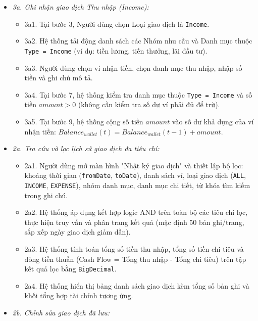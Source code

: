 \documentclass[11pt,a4paper]{article}
\providecommand{\tightlist}{
  \setlength{\itemsep}{0pt}\setlength{\parskip}{0pt}}
\begin{document}
\begin{itemize}
  \begin{itemize}
  \tightlist
  \item
    \emph{3a. Ghi nhận giao dịch Thu nhập (Income):}

    \begin{itemize}
    \tightlist
    \item
      3a1. Tại bước 3, Người dùng chọn Loại giao dịch là
      \texttt{Income}.
    \item
      3a2. Hệ thống tải động danh sách các Nhóm nhu cầu và Danh mục
      thuộc \texttt{Type\ =\ Income} (ví dụ: tiền lương, tiền thưởng,
      lãi đầu tư).
    \item
      3a3. Người dùng chọn ví nhận tiền, chọn danh mục thu nhập, nhập số
      tiền và ghi chú mô tả.
    \item
      3a4. Tại bước 7, hệ thống kiểm tra danh mục thuộc
      \texttt{Type\ =\ Income} và số tiền \(amount > 0\) (không cần kiểm
      tra số dư ví phải đủ để trừ).
    \item
      3a5. Tại bước 9, hệ thống cộng số tiền \(amount\) vào số dư khả
      dụng của ví nhận tiền:
      \(Balance_{wallet}(t) = Balance_{wallet}(t-1) + amount\).
    \end{itemize}
  \item
    \emph{2a. Tra cứu và lọc lịch sử giao dịch đa tiêu chí:}

    \begin{itemize}
    \tightlist
    \item
      2a1. Người dùng mở màn hình "Nhật ký giao dịch" và thiết lập bộ
      lọc: khoảng thời gian (\texttt{fromDate}, \texttt{toDate}), danh
      sách ví, loại giao dịch (\texttt{ALL}, \texttt{INCOME},
      \texttt{EXPENSE}), nhóm danh mục, danh mục chi tiết, từ khóa tìm
      kiếm trong ghi chú.
    \item
      2a2. Hệ thống áp dụng kết hợp logic AND trên toàn bộ các tiêu chí
      lọc, thực hiện truy vấn và phân trang kết quả (mặc định 50 bản
      ghi/trang, sắp xếp ngày giao dịch giảm dần).
    \item
      2a3. Hệ thống tính toán tổng số tiền thu nhập, tổng số tiền chi
      tiêu và dòng tiền thuần (Cash Flow = Tổng thu nhập - Tổng chi
      tiêu) trên tập kết quả lọc bằng \texttt{BigDecimal}.
    \item
      2a4. Hệ thống hiển thị bảng danh sách giao dịch kèm tổng số bản
      ghi và khối tổng hợp tài chính tương ứng.
    \end{itemize}
  \item
    \emph{2b. Chỉnh sửa giao dịch đã lưu:}


\end{itemize}
\end{itemize}
\end{document}
